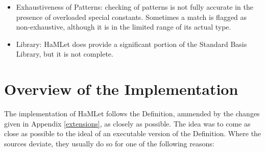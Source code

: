 \documentclass[twoside,titlepage]{article}
\newcommand{\void}[1]{}
\begin{document}
\begin{itemize}

\void{
\item Parsing: The grammar in the Definition together with its informal disambiguation rules is rather over-ambitious. It is not possible to parse it with finite look-ahead, as required by conventional parsing technology -- at least not without performing a major nightmare of grammar transformations first. Consequently, all existing SML implementations disallow some phrases that ought to be legal according to the Definition. The most obvious examples are mixtures of $\mathit{fvalbind}$s and {\tt case} expressions like in

\begin{quote}
\begin{alltt}
fun f p1 = case e1 of p2 => e2
  | f p3 = e3
\end{alltt}
\end{quote}

No effort has been made to get this working in HaMLet. However, HaMLet is still more accurate than other SML implementations. For example, it parses the dreaded {\tt where type} ... {\tt and type} derived form for signature expressions correctly (see Section \ref{ambiguities}).
}

\item Exhaustiveness of Patterns: checking of patterns is not fully accurate in the presence of overloaded special constants. Sometimes a match is flagged as non-exhaustive, although it is in the limited range of its actual type.

\item Library: HaMLet does provide a significant portion of the Standard Basis Library, but it is not complete.
\end{itemize}



\section{Overview of the Implementation}
\label{implementationoverview}

The implementation of HaMLet follows the Definition, ammended by the changes given in Appendix \ref{extensions}, as closely as possible. The idea was to come as close as possible to the ideal of an executable version of the Definition. Where the sources deviate, they usually do so for one of the following reasons:
\end{document}
